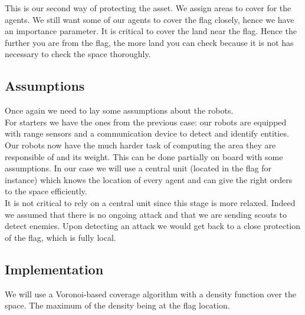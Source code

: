 \documentclass[journal]{IEEEtran}
\begin{document}
This is our second way of protecting the asset. We assign areas to cover for the agents. We still want some of our agents to cover the flag closely, hence we have an importance parameter. It is critical to cover the land near the flag. Hence the further you are from the flag, the more land you can check because it is not has necessary to check the space thoroughly.

\subsection{Assumptions}

Once again we need to lay some assumptions about the robots.\\

For starters we have the ones from the previous case: our robots are equipped with range sensors and a communication device to detect and identify entities.\\

Our robots now have the much harder task of computing the area they are responsible of and its weight. This can be done partially on board with some assumptions. In our case we will use a central unit (located in the flag for instance) which knows the location of every agent and can give the right orders to the space efficiently.\\

It is not critical to rely on a central unit since this stage is more relaxed. Indeed we assumed that there is no ongoing attack and that we are sending scouts to detect enemies. Upon detecting an attack we would get back to a close protection of the flag, which is fully local.

\subsection{Implementation}

We will use a Voronoi-based coverage algorithm with a density function over the space.
The maximum of the density being at the flag location.\\
\end{document}
